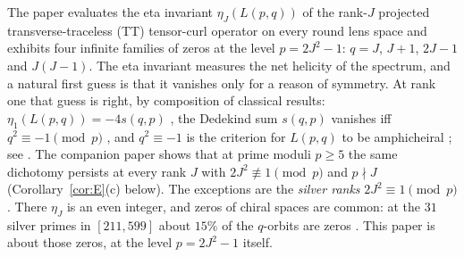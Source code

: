 \documentclass[11pt]{article}
\theoremstyle{definition}
\begin{document}
The paper \cite{MahmoodP1Collection2026} evaluates the eta invariant
$\eta_J(L(p,q))$ of the rank-$J$ projected transverse-traceless (TT)
tensor-curl operator on every round lens space and exhibits four
infinite families of zeros at the level $p=2J^2-1$:
$q=J$, $J+1$, $2J-1$ and $J(J-1)$.  The eta invariant measures the net
helicity of the spectrum, and a natural first guess is that it vanishes
only for a reason of symmetry.  At rank one that guess is right, by
composition of classical results: $\eta_1(L(p,q))=-4s(q,p)$
\cite{MahmoodP1Collection2026}, the Dedekind sum $s(q,p)$ vanishes iff
$q^2\equiv-1\pmod p$ \cite[p.~36]{RademacherGrosswald1972}, and
$q^2\equiv-1$ is the criterion for $L(p,q)$ to be amphicheiral
\cite{PrzytyckiYasuhara2003,Boldt2017}; see
\cite[Cor.~4.4]{LensChirality2026}.  The companion paper
\cite{LensChirality2026} shows that at prime moduli $p\geq5$ the same
dichotomy persists at every rank $J$ with $2J^2\not\equiv1\pmod p$ and
$p\nmid J$ (Corollary~\ref{cor:E}(c) below).  The exceptions are the
\emph{silver ranks} $2J^2\equiv1\pmod p$.  There $\eta_J$ is an even
integer, and zeros of chiral spaces are common: at the $31$ silver primes
in $[211,599]$ about $15\%$ of the $q$-orbits are zeros
\cite[Obs.~5.6]{LensChirality2026}.  This paper is about those zeros, at
the level $p=2J^2-1$ itself.
\end{document}
